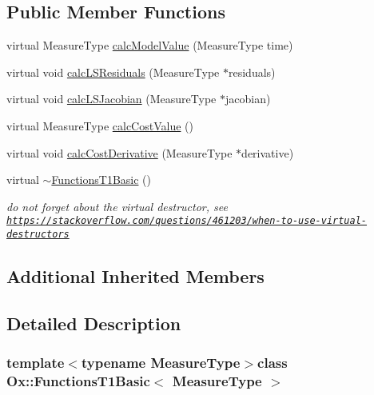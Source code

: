 \subsection*{Public Member Functions}
\begin{DoxyCompactItemize}
\item 
virtual Measure\-Type \hyperlink{class_ox_1_1_functions_t1_basic_ad23b00edd74fdf78c7d21fa82bb66e6e}{calc\-Model\-Value} (Measure\-Type time)
\item 
virtual void \hyperlink{class_ox_1_1_functions_t1_basic_ac9f77d95d7b39f2333b520d3a2e639e9}{calc\-L\-S\-Residuals} (Measure\-Type $\ast$residuals)
\item 
virtual void \hyperlink{class_ox_1_1_functions_t1_basic_a3beaaac6e2e1be4f9bd2e7cba7c51057}{calc\-L\-S\-Jacobian} (Measure\-Type $\ast$jacobian)
\item 
virtual Measure\-Type \hyperlink{class_ox_1_1_functions_t1_basic_adee7b03ad49d28e5dc08a80b2c948da1}{calc\-Cost\-Value} ()
\item 
virtual void \hyperlink{class_ox_1_1_functions_t1_basic_aa6a067295d09882f70eeb34b260c37b7}{calc\-Cost\-Derivative} (Measure\-Type $\ast$derivative)
\item 
\hypertarget{class_ox_1_1_functions_t1_basic_ae3f94c1426a8e6f569b8c70f86122c0b}{virtual \hyperlink{class_ox_1_1_functions_t1_basic_ae3f94c1426a8e6f569b8c70f86122c0b}{$\sim$\-Functions\-T1\-Basic} ()}\label{class_ox_1_1_functions_t1_basic_ae3f94c1426a8e6f569b8c70f86122c0b}

\begin{DoxyCompactList}\small\item\em do not forget about the virtual destructor, see \href{https://stackoverflow.com/questions/461203/when-to-use-virtual-destructors}{\tt https\-://stackoverflow.\-com/questions/461203/when-\/to-\/use-\/virtual-\/destructors} \end{DoxyCompactList}\end{DoxyCompactItemize}
\subsection*{Additional Inherited Members}


\subsection{Detailed Description}
\subsubsection*{template$<$typename Measure\-Type$>$class Ox\-::\-Functions\-T1\-Basic$<$ Measure\-Type $>$}

